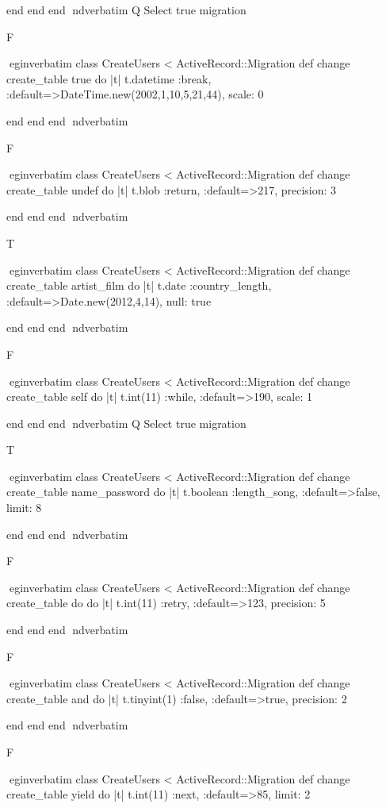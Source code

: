     end 
  end 
end
nd{verbatim}
Q
 Select true migration

F

egin{verbatim}
 class CreateUsers < ActiveRecord::Migration 
  def change 
    create_table true do |t| 
      t.datetime :break, :default=>DateTime.new(2002,1,10,5,21,44), scale: 0
    
    end 
  end 
end
nd{verbatim}

F

egin{verbatim}
 class CreateUsers < ActiveRecord::Migration 
  def change 
    create_table undef do |t| 
      t.blob :return, :default=>217, precision: 3
    
    end 
  end 
end
nd{verbatim}

T

egin{verbatim}
 class CreateUsers < ActiveRecord::Migration 
  def change 
    create_table artist_film do |t| 
      t.date :country_length, :default=>Date.new(2012,4,14), null: true
    
    end 
  end 
end
nd{verbatim}

F

egin{verbatim}
 class CreateUsers < ActiveRecord::Migration 
  def change 
    create_table self do |t| 
      t.int(11) :while, :default=>190, scale: 1
    
    end 
  end 
end
nd{verbatim}
Q
 Select true migration

T

egin{verbatim}
 class CreateUsers < ActiveRecord::Migration 
  def change 
    create_table name_password do |t| 
      t.boolean :length_song, :default=>false, limit: 8
    
    end 
  end 
end
nd{verbatim}

F

egin{verbatim}
 class CreateUsers < ActiveRecord::Migration 
  def change 
    create_table do do |t| 
      t.int(11) :retry, :default=>123, precision: 5
    
    end 
  end 
end
nd{verbatim}

F

egin{verbatim}
 class CreateUsers < ActiveRecord::Migration 
  def change 
    create_table and do |t| 
      t.tinyint(1) :false, :default=>true, precision: 2
    
    end 
  end 
end
nd{verbatim}

F

egin{verbatim}
 class CreateUsers < ActiveRecord::Migration 
  def change 
    create_table yield do |t| 
      t.int(11) :next, :default=>85, limit: 2
    
